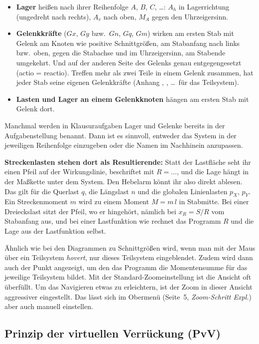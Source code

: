 \begin{itemize}
  \item \textbf{Lager} heißen nach ihrer Reihenfolge $A$, $B$, $C$, \dots: $A_h$ in Lagerrichtung
        (ungedreht nach rechts), $A_v$ nach oben, $M_A$ gegen den Uhrzeigersinn.
  \item \textbf{Gelenkkräfte} ($Gx$, $Gy$ bzw.\ $Gn$, $Gq$, $Gm$) wirken am ersten Stab mit Gelenk
        am Knoten wie positive Schnittgrößen, am Stabanfang nach links bzw.\ oben, gegen die
        Stabachse und im Uhrzeigersinn, am Stabende umgekehrt. Und auf der anderen Seite des
        Gelenks genau entgegengesetzt (actio = reactio). Treffen mehr als zwei Teile in einem
        Gelenk zusammen, hat jeder Stab seine eigenen Gelenkkräfte (Anhang , ,
        \dots\ für das Teilsystem).
  \item \textbf{Lasten und Lager an einem Gelenkknoten} hängen am ersten Stab mit Gelenk dort.
\end{itemize}

Manchmal werden in Klausuraufgaben Lager und Gelenke bereits in der Aufgabenstellung benannt.
Dann ist es sinnvoll, entweder das System in der jeweiligen Reihenfolge einzugeben oder die Namen im Nachhinein anzupassen.

\textbf{Streckenlasten stehen dort als Resultierende:} Statt der Lastfläche seht ihr einen Pfeil
auf der Wirkungslinie, beschriftet mit $R = \dots$, und die Lage hängt in der Maßkette unter dem
System. Den Hebelarm könnt ihr also direkt ablesen. Das gilt für die Querlast $q$, die Längslast
$n$ und die globalen Linienlasten $p_X$, $p_Y$. Ein Streckenmoment $m$ wird zu einem Moment
$M = m\,l$ in Stabmitte. Bei einer Dreieckslast sitzt der Pfeil, wo er hingehört, nämlich bei
$x_R = S/R$ vom Stabanfang aus, und bei einer Lastfunktion wie  rechnet das
Programm $R$ und die Lage aus der Lastfunktion selbst.


Ähnlich wie bei den Diagrammen zu Schnittgrößen wird, wenn man mit der Maus über ein Teilsystem \emph{hovert},
nur dieses Teilsystem eingeblendet. Zudem wird dann auch der Punkt angezeigt, um den das Programm die Momentensumme für das jeweilige Teilsystem bildet.
Mit der Standard-Zoomeinstellung ist die Ansicht oft überfüllt. Um das Navigieren etwas zu erleichtern, ist der Zoom in dieser Ansicht aggressiver eingestellt.
Das lässt sich im Obermenü (Seite~5, \emph{Zoom-Schritt Expl.}) aber auch manuell einstellen.

\subsection{Prinzip der virtuellen Verrückung (PvV)}\label{sec:pvv}

